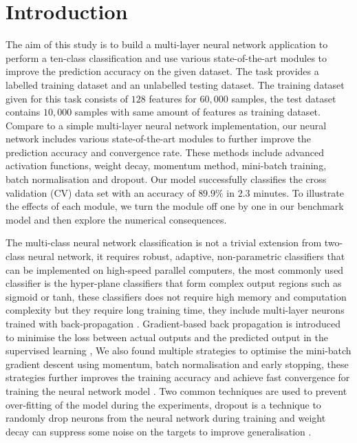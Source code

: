 \section{Introduction\label{chapter1}}

The aim of this study is to build a multi-layer neural network application to perform a ten-class classification and use various state-of-the-art modules to improve the prediction accuracy on the given dataset.
The task provides a labelled training dataset and an unlabelled testing dataset.
The training dataset given for this task consists of $128$ features for $60,000$ samples,
the test dataset contains $10,000$ samples with same amount of features as training dataset.
Compare to a simple multi-layer neural network implementation,%
our neural network includes various state-of-the-art modules to further improve the prediction accuracy and convergence rate. These methods include advanced activation functions, 
weight decay, 
momentum method,
mini-batch training, batch normalisation and dropout. 
Our model successfully classifies the cross validation (CV) data set with an accuracy of $89.9\%$ in $2.3$ minutes. 
To illustrate the effects of each module, we turn the module off one by one in our benchmark model and then explore the numerical consequences.

The multi-class neural network classification is not a trivial extension from two-class neural network,
it requires robust, adaptive, non-parametric classifiers that can be implemented on high-speed parallel computers,
the most commonly used classifier is the hyper-plane classifiers that form complex output regions such as sigmoid or tanh,
these classifiers does not require high memory and computation complexity but they require long training time,
they include multi-layer neurons trained with back-propagation \citet{werbos1990backpropagation}.
Gradient-based back propagation is introduced to minimise the loss between actual outputs and the predicted output in the supervised learning \citet{lecun1998Gradient},
We also found multiple strategies to optimise the mini-batch gradient descent using momentum, batch normalisation and early stopping,
these strategies further improves the training accuracy and achieve fast convergence for training the neural network model \citet{ruder2016overview}.
Two common techniques are used to prevent over-fitting of the model during the experiments, dropout is a technique to randomly drop neurons from the neural network during training \citet{dropout} and weight decay can suppress some noise on the targets to improve generalisation \citet{NIPS1991_563}.

